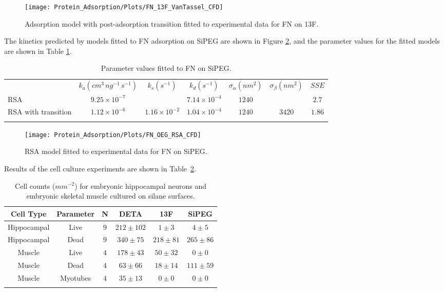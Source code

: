 %
\begin{figure}
\texttt{[image: Protein\_Adsorption/Plots/FN\_13F\_VanTassel\_CFD]}

\caption{\label{fig:FN 13F fitted}Adsorption model with post-adsorption transition
fitted to experimental data for FN on 13F.}
%
\end{figure}
 The kinetics predicted by models fitted to FN adsorption on SiPEG
are shown in Figure \ref{fig:FN OEG fitted}, and the parameter values
for the fitted models are shown in Table \ref{tab:FN OEG fitted params}.%
\begin{table}
\caption{\label{tab:FN OEG fitted params}Parameter values fitted to FN on
SiPEG.}
\begin{tabular}{>{\raggedright}p{0.75in}cccccc}
 & $k_{a}\left(cm^{3}\, ng^{-1}\, s^{-1}\right)$ & $k_{s}\left(s^{-1}\right)$ & $k_{d}\left(s^{-1}\right)$ & $\sigma_{\alpha}\left(nm^{2}\right)$ & $\sigma_{\beta}\left(nm^{2}\right)$ & $SSE$\tabularnewline[\doublerulesep]
\cline{2-7} 
\noalign{\vskip\doublerulesep}
RSA & $9.25\times10^{-7}$ &  & $7.14\times10^{-4}$ & $1240$ &  & $2.7$\tabularnewline
\noalign{\vskip\doublerulesep}
RSA with transition & $1.12\times10^{-6}$ & $1.16\times10^{-2}$ & $1.04\times10^{-4}$ & $1240$ & $3420$ & $1.86$\tabularnewline
\noalign{\vskip\doublerulesep}
\end{tabular}%
\end{table}
%
\begin{figure}
\texttt{[image: Protein\_Adsorption/Plots/FN\_OEG\_RSA\_CFD]}

\caption{\label{fig:FN OEG fitted}RSA model fitted to experimental data for
FN on SiPEG.}
%
\end{figure}
 Results of the cell culture experiments are shown in Table~\ref{tab:Cell counts on FN}.%
\begin{table}
\caption{\label{tab:Cell counts on FN}Cell counts ($mm^{-2}$) for embryonic
hippocampal neurons and embryonic skeletal muscle cultured on silane
surfaces.}


\begin{tabular}{cccccc}
Cell Type & Parameter & N & DETA & 13F & SiPEG\tabularnewline[\doublerulesep]
\hline
\noalign{\vskip\doublerulesep}
Hippocampal & Live & $9$ & $212\pm102$ & $1\pm3$ & $4\pm5$\tabularnewline
\noalign{\vskip\doublerulesep}
Hippocampal & Dead & $9$ & $340\pm75$ & $218\pm81$ & $265\pm86$\tabularnewline
\noalign{\vskip\doublerulesep}
Muscle & Live & $4$ & $178\pm43$ & $50\pm32$ & $0\pm0$\tabularnewline
\noalign{\vskip\doublerulesep}
Muscle & Dead & $4$ & $63\pm66$ & $18\pm14$ & $111\pm59$\tabularnewline
\noalign{\vskip\doublerulesep}
Muscle & Myotubes & $4$ & $35\pm13$ & $0\pm0$ & $0\pm0$\tabularnewline
\noalign{\vskip\doublerulesep}
\end{tabular}%
\end{table}



